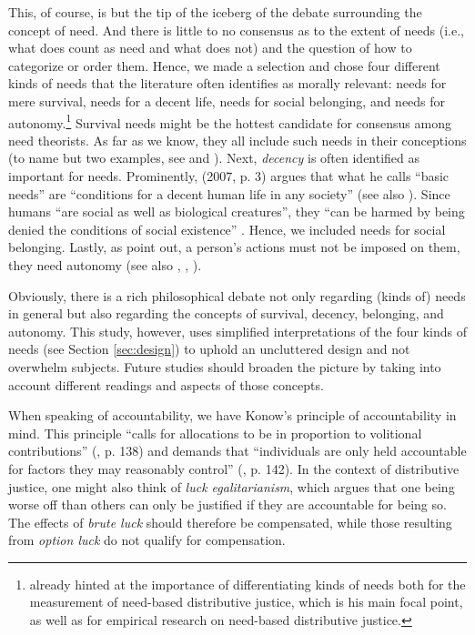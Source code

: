 \documentclass[egregdoesnotlikesansseriftitles]{scrartcl}
\begin{document}
This, of course, is but the tip of the iceberg of the debate surrounding the concept of need.
And there is little to no consensus as to the extent of needs (i.e., what does count as need and what does not) and the question of how to categorize or order them.
Hence, we made a selection and chose four different kinds of needs that the literature often identifies as morally relevant: needs for mere survival, needs for a decent life, needs for social belonging, and needs for autonomy.\footnote{\cite{bauer_sated_2018,bauer_sated_2022} already hinted at the importance of differentiating kinds of needs both for the measurement of need-based distributive justice, which is his main focal point, as well as for empirical research on need-based distributive justice.}
Survival needs might be the hottest candidate for consensus among need theorists.
As far as we know, they all include such needs in their conceptions (to name but two examples, see \citealt{wiggins_needs_1987} and \citealt{daniels_just_1985}).
Next, \textit{decency} is often identified as important for needs.
Prominently, \citeauthor{miller_human_2007} (2007, p. 3) argues that what he calls ``basic needs'' are ``conditions for a decent human life in any society'' (see also \citealt{miller_principles_1999}).
Since humans ``are social as well as biological creatures'', they ``can be harmed by being denied the conditions of social existence'' \cite[p. 3]{miller_human_2007}.
Hence, we included needs for social belonging.
Lastly, as \citet{doyal_theory_1984,doyal_theory_1991} point out, a person's actions must not be imposed on them, they need autonomy (see also \citealt{hamilton_political_2003}, \citealt{brock_needs_2005}, \citealt{siebel_need-based_2020}).

Obviously, there is a rich philosophical debate not only regarding (kinds of) needs in general but also regarding the concepts of survival, decency, belonging, and autonomy.
This study, however, uses simplified interpretations of the four kinds of needs (see Section \ref{sec:design}) to uphold an uncluttered design and not overwhelm subjects.
Future studies should broaden the picture by taking into account different readings and aspects of those concepts.

When speaking of accountability, we have Konow's principle of accountability in mind.
This principle ``calls for allocations to be in proportion to volitional contributions'' (\citealt{konow_fair_2001}, p. 138) and demands that ``individuals are only held accountable for factors they may reasonably control'' (\citealt{konow_fair_2001}, p. 142).
In the context of distributive justice, one might also think of \textit{luck egalitarianism}, which argues that one being worse off than others can only be justified if they are accountable for being so.
The effects of \textit{brute luck} should therefore be compensated, while those resulting from \textit{option luck} do not qualify for compensation.
\end{document}
